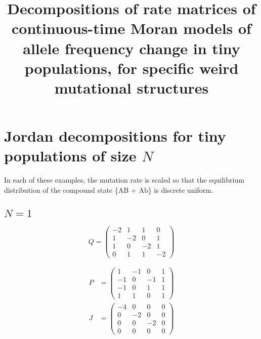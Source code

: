 \documentclass{article}
\theoremstyle{plain}
\theoremstyle{definition}
\begin{document}
\title
{
	Decompositions of rate matrices of continuous-time Moran
	models of allele frequency change in tiny populations,
	for specific weird mutational structures
}
\maketitle

\section{Jordan decompositions for tiny populations of size $N$}

In each of these examples,
the mutation rate is scaled so that the equilibrium distribution
of the compound state \{AB + Ab\} is discrete uniform.

\subsection{$N=1$}

\begin{equation}
	Q =
	\begin{pmatrix}
		-2 & 1 & 1 & 0 \\
		1 & -2 & 0 & 1 \\
		1 & 0 & -2 & 1 \\
		0 & 1 & 1 & -2
	\end{pmatrix}
\end{equation}

\begin{align}
	P &=
	\begin{pmatrix}
		1 & -1 & 0 & 1 \\
		-1 & 0 & -1 & 1 \\
		-1 & 0 & 1 & 1 \\
		1 & 1 & 0 & 1
	\end{pmatrix} \\
	J &=
	\begin{pmatrix}
		-4 & 0 & 0 & 0 \\
		0 & -2 & 0 & 0 \\
		0 & 0 & -2 & 0 \\
		0 & 0 & 0 & 0
	\end{pmatrix}
\end{align}
\end{document}
